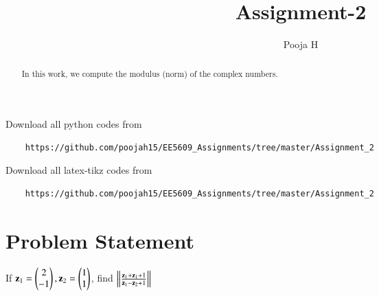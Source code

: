 \documentclass[journal,12pt,twocolumn]{IEEEtran}
\begin{document}
	\makeatother
	\let\StandardTheFigure\thefigure
	\let\vec\mathbf
	\renewcommand{\thefigure}{\theproblem}
	\def\putbox#1#2#3{\makebox[0in][l]{\makebox[#1][l]{}\raisebox{\baselineskip}[0in][0in]{\raisebox{#2}[0in][0in]{#3}}}}
	\def\rightbox#1{\makebox[0in][r]{#1}}
	\def\centbox#1{\makebox[0in]{#1}}
	\def\topbox#1{\raisebox{-\baselineskip}[0in][0in]{#1}}
	\def\midbox#1{\raisebox{-0.5\baselineskip}[0in][0in]{#1}}
	\vspace{3cm}
	\title{Assignment-2}
	\author{Pooja H \\ }
	\maketitle
	\newpage
	\bigskip
	\renewcommand{\thefigure}{\theenumi}
	\renewcommand{\thetable}{\theenumi}
	\begin{abstract}
		In this work, we compute the modulus (norm) of the complex numbers.
	\end{abstract}
	Download all python codes from 
	\begin{lstlisting}
	https://github.com/poojah15/EE5609_Assignments/tree/master/Assignment_2
	\end{lstlisting}
	Download all latex-tikz codes from 
	\begin{lstlisting}
	https://github.com/poojah15/EE5609_Assignments/tree/master/Assignment_2
	\end{lstlisting}
	\section{Problem Statement}
	If $\vec{z}_1 = \myvec{2 \\ -1}, \vec{z}_2 = \myvec{1 \\ 1}$, find $\norm{\frac{\vec{z}_1 + \vec{z}_1 + 1}{\vec{z}_1-\vec{z}_2+1}}$ 
\end{document}
